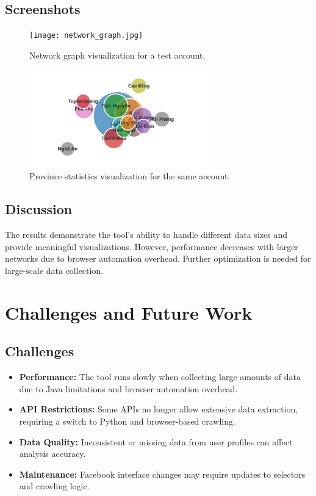 \documentclass[13pt,a4paper]{report}
\begin{document}
\section{Screenshots}
\begin{figure}[h!]
    \centering
    \texttt{[image: network\_graph.jpg]}
    \caption{Network graph visualization for a test account.}
\end{figure}

\begin{figure}[h!]
    \centering
    \includegraphics[width=0.7\textwidth]{province_stats.jpg}
    \caption{Province statistics visualization for the same account.}
\end{figure}

\section{Discussion}
The results demonstrate the tool's ability to handle different data sizes and provide meaningful visualizations. However, performance decreases with larger networks due to browser automation overhead. Further optimization is needed for large-scale data collection.

\chapter{Challenges and Future Work}
\section{Challenges}
\begin{itemize}
    \item \textbf{Performance:} The tool runs slowly when collecting large amounts of data due to Java limitations and browser automation overhead.
    \item \textbf{API Restrictions:} Some APIs no longer allow extensive data extraction, requiring a switch to Python and browser-based crawling.
    \item \textbf{Data Quality:} Inconsistent or missing data from user profiles can affect analysis accuracy.
    \item \textbf{Maintenance:} Facebook interface changes may require updates to selectors and crawling logic.
\end{itemize}
\end{document}
